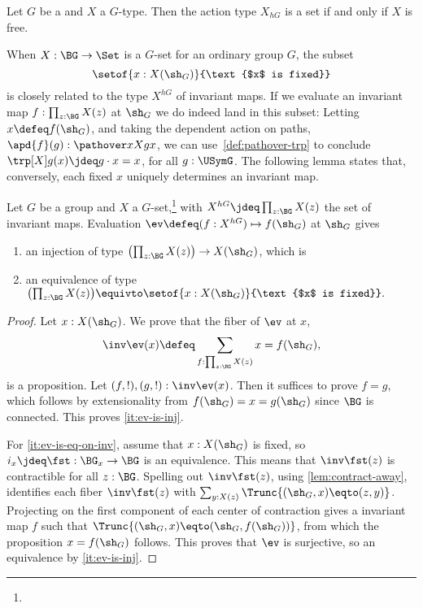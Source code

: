\begin{xca}\label{xca:X_hG-set-iff-Xfree}
Let $G$ be a \aninftygp and $X$ a $G$-type. Then the
action type $X_{hG}$ is a set if and only if $X$ is free.
\end{xca}

When $X : \BG \to \Set$ is a $G$-set for an ordinary group $G$, the subset
\[
  \setof{x : X(\sh_G)}{\text{$x$ is fixed}}
\]
is closely related to the type $X^{hG}$ of invariant maps.
If we evaluate an invariant map $f : \prod_{z:\BG}X(z)$ at $\sh_G$
we do indeed land in this subset:
Letting $x\defeq f(\sh_G)$,
and taking the dependent action on paths,
$\apd{f}(g) : \pathover x X g x$,
we can use~\cref{def:pathover-trp} to conclude
$\trp[X] g(x)\jdeq g\cdot x = x$, for all $g:\USymG$.
The following lemma states that, conversely, each fixed $x$ uniquely
determines an invariant map.

\begin{lemma}\label{lem:fixpts-are-fixed}
  Let $G$ be a group and $X$ a $G$-set,\footnote{}
  with $X^{hG} \jdeq \prod_{z:\BG}X(z)$
  the set of invariant maps. 
  Evaluation $\ev\defeq(f:X^{hG})\mapsto f(\sh_G)$ at $\sh_G$ gives
  \begin{enumerate}
  \item\label{it:ev-is-inj} 
  an injection of type $\bigl(\prod_{z:\BG}X(z)\bigr) \to X(\sh_G)$, which is
  \item\label{it:ev-is-eq-on-inv} an equivalence of type 
  $\bigl(\prod_{z:\BG}X(z)\bigr) \equivto
  \setof{x : X(\sh_G)}{\text{$x$ is fixed}}.$
  \end{enumerate}
\end{lemma}
\begin{proof}
  Let $x : X(\sh_G)$. We prove that the fiber of $\ev$ at $x$,
  \[
    \inv\ev(x) \defeq \sum_{f : \prod_{z:\BG}X(z)} x=f(\sh_G),
  \]
  is a proposition. Let $(f,!),(g,!) : \inv\ev(x)$. 
  Then it suffices to prove $f=g$, which follows by extensionality
  from $f(\sh_G)=x=g(\sh_G)$ since $\BG$ is connected. This proves
  \ref{it:ev-is-inj}.
  
  For \ref{it:ev-is-eq-on-inv}, assume that
  $x : X(\sh_G)$ is fixed, so $i_x\jdeq\fst:\BG_x \to \BG$
  is an equivalence. This means that $\inv\fst(z)$ is contractible
  for all $z:\BG$. Spelling out $\inv\fst(z)$, using \cref{lem:contract-away},
  identifies each fiber $\inv\fst(z)$ with
  $\sum_{y:X(z)}\Trunc{(\sh_G,x)\eqto(z,y)}$.
  Projecting on the first component of each center of contraction
  gives a invariant map $f$ such that $\Trunc{(\sh_G,x)\eqto(\sh_G,f(\sh_G))}$,
  from which the proposition $x=f(\sh_G)$ follows. This proves that
  $\ev$ is surjective, so an equivalence by \ref{it:ev-is-inj}.
\end{proof}


